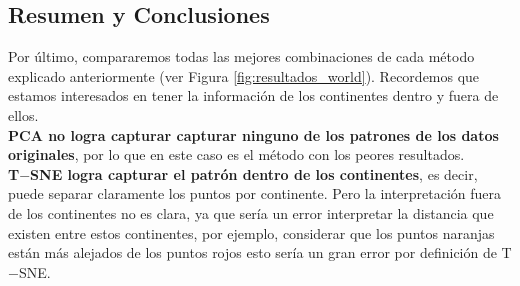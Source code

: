 \documentclass[paper=letter, fontsize=11pt]{scrartcl}
\numberwithin{equation}{section} %
\numberwithin{figure}{section} %
\numberwithin{table}{section} %
\begin{document}
\subsection{Resumen y Conclusiones}
Por último, compararemos todas las mejores combinaciones de cada método explicado anteriormente (ver Figura \ref{fig:resultados_world}). Recordemos que estamos interesados en tener la información de los continentes dentro y fuera de ellos.\\

\textbf{PCA no logra capturar capturar ninguno de los patrones de los datos originales}, por lo que en este caso es el método con los peores resultados. \\

\textbf{T$-$SNE logra capturar el patrón dentro de los continentes}, es decir, puede separar claramente los puntos por continente. Pero la interpretación fuera de los continentes no es clara, ya que sería un error interpretar la distancia que existen entre estos continentes, por ejemplo, considerar que los puntos naranjas están más alejados de los puntos rojos esto sería un gran error por definición de T$-$SNE.\\
\end{document}
